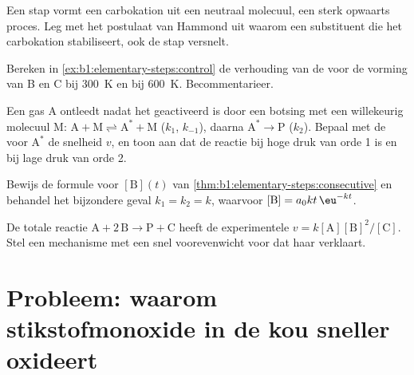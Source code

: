 \begin{exercise}[$\star\star$]\label{exo:b1:elementary-steps:8}
Een stap vormt een carbokation uit een neutraal molecuul, een sterk
opwaarts proces. Leg met het postulaat van Hammond uit waarom een
substituent die het carbokation stabiliseert, ook de stap versnelt.
\end{exercise}

\begin{exercise}[$\star\star$]\label{exo:b1:elementary-steps:9}
Bereken in \cref{ex:b1:elementary-steps:control} de verhouding van de
 voor de vorming van B en C bij \qty{300}{K} en bij
\qty{600}{K}. Becommentarieer.
\end{exercise}

\begin{exercise}[$\star\star\star$]\label{exo:b1:elementary-steps:10}
Een gas $\mathrm{A}$ ontleedt nadat het geactiveerd is door een botsing
met een willekeurig molecuul $\mathrm{M}$:
$\mathrm{A} + \mathrm{M} \rightleftharpoons
\mathrm{A}^* + \mathrm{M}$ ($k_1$, $k_{-1}$), daarna $\mathrm{A}^* \to
\mathrm{P}$ ($k_2$). Bepaal met de  voor
$\mathrm{A}^*$ de snelheid $v$, en toon aan dat de reactie bij hoge druk van orde 1
is en bij lage druk van orde 2.
\end{exercise}

\begin{exercise}[$\star\star\star$]\label{exo:b1:elementary-steps:11}
Bewijs de formule voor $[\mathrm{B}](t)$ van
\cref{thm:b1:elementary-steps:consecutive} en behandel het bijzondere
geval $k_1 = k_2 = k$, waarvoor $[\mathrm{B}] = a_0kt\,\eu^{-kt}$.
\end{exercise}

\begin{exercise}[$\star\star\star$]\label{exo:b1:elementary-steps:12}
De totale reactie $\mathrm{A} + 2\,\mathrm{B} \to \mathrm{P} +
\mathrm{C}$ heeft de experimentele  $v =
k[\mathrm{A}][\mathrm{B}]^2/[\mathrm{C}]$. Stel een mechanisme met een snel
voorevenwicht voor dat haar verklaart.
\end{exercise}

\section{Probleem: waarom stikstofmonoxide in de kou sneller oxideert}

